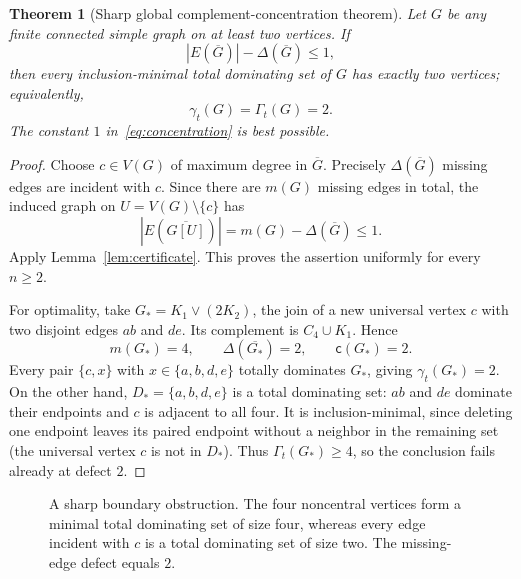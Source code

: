 \documentclass[11pt,a4paper]{article}
\newtheorem{theorem}{Theorem}[section]
\theoremstyle{definition}\newtheorem{definition}[theorem]{Definition}
\theoremstyle{remark}\newtheorem{remark}[theorem]{Remark}
\newcommand{\Gbar}{\overline G}
\newcommand{\compdef}{\mathsf c}
\newcommand{\V}{V(G)}
\begin{document}
\begin{theorem}[Sharp global complement-concentration theorem]\label{thm:main}
Let $G$ be any finite connected simple graph on at least two vertices. If
\begin{equation}\label{eq:concentration}
\boxed{\quad |E(\Gbar)|-\Delta(\Gbar)\le1,\quad}
\end{equation}
then every inclusion-minimal total dominating set of $G$ has exactly two vertices; equivalently,
\[\boxed{\quad \gamma_t(G)=\Gamma_t(G)=2.\quad}\]
The constant $1$ in~\eqref{eq:concentration} is best possible.
\end{theorem}
\begin{proof}
Choose $c\in\V$ of maximum degree in $\Gbar$. Precisely $\Delta(\Gbar)$ missing edges are incident with $c$. Since there are $m(G)$ missing edges in total, the induced graph on $U=\V\setminus\{c\}$ has
\[
|E(\overline{G[U]})|=m(G)-\Delta(\Gbar)\le1.
\]
Apply Lemma~\ref{lem:certificate}. This proves the assertion uniformly for every $n\ge2$.

For optimality, take $G_\ast=K_1\vee(2K_2)$, the join of a new universal vertex $c$ with two disjoint edges $ab$ and $de$. Its complement is $C_4\cup K_1$. Hence
\[m(G_\ast)=4,\qquad \Delta(\overline{G_\ast})=2,\qquad \compdef(G_\ast)=2.\]
Every pair $\{c,x\}$ with $x\in\{a,b,d,e\}$ totally dominates $G_\ast$, giving $\gamma_t(G_\ast)=2$. On the other hand, $D_\ast=\{a,b,d,e\}$ is a total dominating set: $ab$ and $de$ dominate their endpoints and $c$ is adjacent to all four. It is inclusion-minimal, since deleting one endpoint leaves its paired endpoint without a neighbor in the remaining set (the universal vertex $c$ is not in $D_\ast$). Thus $\Gamma_t(G_\ast)\ge4$, so the conclusion fails already at defect $2$.
\end{proof}

\begin{figure}[ht]
\centering
{}
\caption{A sharp boundary obstruction. The four noncentral vertices form a minimal total dominating set of size four, whereas every edge incident with $c$ is a total dominating set of size two. The missing-edge defect equals $2$.}
\label{fig:sharp}
\end{figure}
\end{document}
